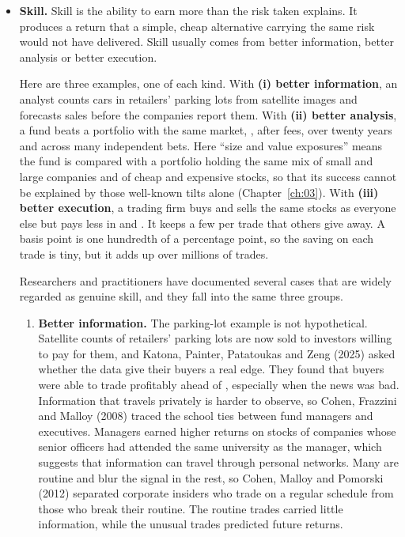 \begin{itemize}
  \item \textbf{Skill.} Skill is the ability to earn more than the risk taken
  explains. It produces a return that a simple, cheap alternative carrying the
  same risk would not have delivered. Skill usually comes from better
  information, better analysis or better execution.

  Here are three examples, one of each kind. 
  With \textbf{(i) better
  information}, an analyst counts cars in retailers' parking lots from
  satellite images and forecasts sales before the companies report them.
  With \textbf{(ii) better analysis}, a fund beats a portfolio with the same
  market, , after fees, over twenty years and across
  many independent bets. Here ``size and value exposures'' means the fund is
  compared with a portfolio holding the same mix of small and large companies
  and of cheap and expensive stocks, so that its success cannot be explained
  by those well-known tilts alone (Chapter~\ref{ch:03}).
  With \textbf{(iii) better execution}, a trading firm
  buys and sells the same stocks as everyone else but pays less in \label{kt:trading-cost} and \label{kt:price-impact}. It keeps a few  per trade that others
  give away. A basis point is one hundredth of a percentage point, so the
  saving on each trade is tiny, but it adds up over millions of trades.

  
  Researchers and practitioners have documented several cases that are widely
  regarded as genuine skill, and they fall into the same three groups.
  
  \begin{enumerate}
    \item \textbf{Better information.} The parking-lot example is not hypothetical.
  Satellite counts of retailers' parking lots are now sold to investors
  willing to pay for them, and Katona, Painter, Patatoukas and Zeng (2025)
  asked whether the data give their buyers a real edge. They found that
  buyers were able to trade profitably ahead of ,
  especially when the news was bad. Information that travels privately is
  harder to observe, so Cohen, Frazzini and Malloy (2008) traced the school
  ties between fund managers and executives. Managers earned higher returns
  on stocks of companies whose senior officers had attended the same
  university as the manager, which suggests that information can travel
  through personal networks. Many  are routine and blur the
  signal in the rest, so Cohen, Malloy and Pomorski (2012) separated
  corporate insiders who trade on a regular schedule from those who break
  their routine. The routine trades carried little information, while the
  unusual trades predicted future returns.


\end{enumerate}
\end{itemize}
